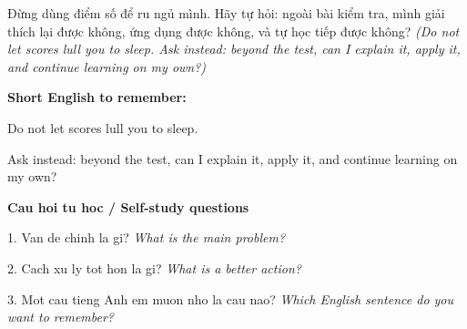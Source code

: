 \begin{baihoc}
Đừng dùng điểm số để ru ngủ mình. Hãy tự hỏi: ngoài bài kiểm tra, mình giải thích lại được không, ứng dụng được không, và tự học tiếp được không?
\textit{(Do not let scores lull you to sleep. Ask instead: beyond the test, can I explain it, apply it, and continue learning on my own?)}
\end{baihoc}

\begin{ghinhoanh}
\textbf{Short English to remember:}

Do not let scores lull you to sleep.

Ask instead: beyond the test, can I explain it, apply it, and continue learning on my own?

\end{ghinhoanh}

\begin{tuhocnhanh}
\textbf{Cau hoi tu hoc / Self-study questions}

1. Van de chinh la gi? \textit{What is the main problem?}

2. Cach xu ly tot hon la gi? \textit{What is a better action?}

3. Mot cau tieng Anh em muon nho la cau nao? \textit{Which English sentence do you want to remember?}
\end{tuhocnhanh}
\ngancach

